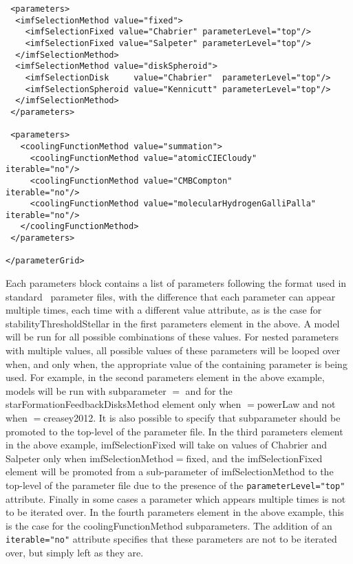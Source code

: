 \begin{verbatim}
 <parameters>
  <imfSelectionMethod value="fixed">
    <imfSelectionFixed value="Chabrier" parameterLevel="top"/>
    <imfSelectionFixed value="Salpeter" parameterLevel="top"/>
  </imfSelectionMethod>
  <imfSelectionMethod value="diskSpheroid">
    <imfSelectionDisk     value="Chabrier"  parameterLevel="top"/>
    <imfSelectionSpheroid value="Kennicutt" parameterLevel="top"/>
  </imfSelectionMethod>
 </parameters>

 <parameters>
   <coolingFunctionMethod value="summation">
     <coolingFunctionMethod value="atomicCIECloudy"             iterable="no"/>
     <coolingFunctionMethod value="CMBCompton"                  iterable="no"/>
     <coolingFunctionMethod value="molecularHydrogenGalliPalla" iterable="no"/>
   </coolingFunctionMethod>
 </parameters>

</parameterGrid>
\end{verbatim}
Each {\normalfont \ttfamily parameters} block contains a list of parameters following the format used in standard \glc\ parameter files, with the difference that each parameter can appear multiple times, each time with a different {\normalfont \ttfamily value} attribute, as is the case for {\normalfont \ttfamily stabilityThresholdStellar} in the first {\normalfont \ttfamily parameters} element in the above. A model will be run for all possible combinations of these values. For nested parameters with multiple values, all possible values of these parameters will be looped over when, and only when, the appropriate value of the containing parameter is being used. For example, in the second {\normalfont \ttfamily parameters} element in the above example, models will be run with subparameter {\normalfont \ttfamily [exponent]}$=${\normalfont {}} and {\normalfont {}} for the {\normalfont \ttfamily starFormationFeedbackDisksMethod} element only when {\normalfont \ttfamily [starFormationFeedbackDisksMethod]}$=${\normalfont \ttfamily powerLaw} and not when {\normalfont \ttfamily [starFormationFeedbackDisksMethod]}$=${\normalfont \ttfamily creasey2012}. It is also possible to specify that subparameter should be promoted to the top-level of the parameter file. In the third {\normalfont \ttfamily parameters} element in the above example, {\normalfont \ttfamily imfSelectionFixed} will take on values of {\normalfont \ttfamily Chabrier} and {\normalfont \ttfamily Salpeter} only when {\normalfont \ttfamily imfSelectionMethod}$=${\normalfont \ttfamily fixed}, and the {\normalfont \ttfamily imfSelectionFixed} element will be promoted from a sub-parameter of {\normalfont \ttfamily imfSelectionMethod} to the top-level of the parameter file due to the presence of the \verb|parameterLevel="top"| attribute. Finally in some cases a parameter which appears multiple times is not to be iterated over. In the fourth {\normalfont \ttfamily parameters} element in the above example, this is the case for the {\normalfont \ttfamily coolingFunctionMethod} subparameters. The addition of an \verb|iterable="no"| attribute specifies that these parameters are not to be iterated over, but simply left as they are.


